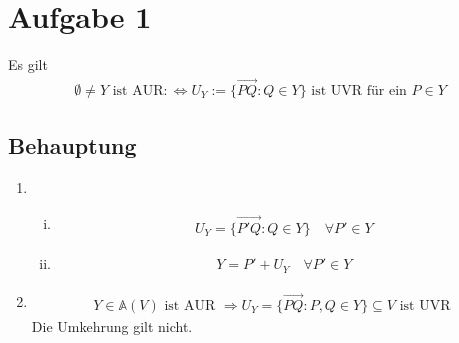 \documentclass[11pt]{article}
\begin{document}
\section*{Aufgabe 1}
Es gilt
\begin{equation*}
\begin{aligned}
\emptyset \neq Y \text{ ist AUR} :\Leftrightarrow U_Y := \lbrace \overrightarrow{PQ} : Q \in Y \rbrace \text{ ist UVR für ein } P \in Y
\end{aligned}
\end{equation*}
\subsection*{Behauptung}
\begin{enumerate}[1)]
	\item
	\begin{enumerate}[i)]
		\item
		\begin{equation*}
		\begin{aligned}
		U_Y = \lbrace \overrightarrow{P'Q}: Q\in Y \rbrace \quad \forall P' \in Y
		\end{aligned}
		\end{equation*}
		\item
		\begin{equation*}
		\begin{aligned}
		Y = P' + U_Y \quad \forall P' \in Y
		\end{aligned}
		\end{equation*}
	\end{enumerate}
\item 
\begin{equation*}
\begin{aligned}
Y \in \mathbb{A}(V) \text{ ist AUR } \Rightarrow U_Y = \lbrace \overrightarrow{PQ}: P,Q \in Y \rbrace \subseteq V \text{ ist UVR}
\end{aligned}
\end{equation*}
Die Umkehrung gilt nicht.
\end{enumerate}
\end{document}
